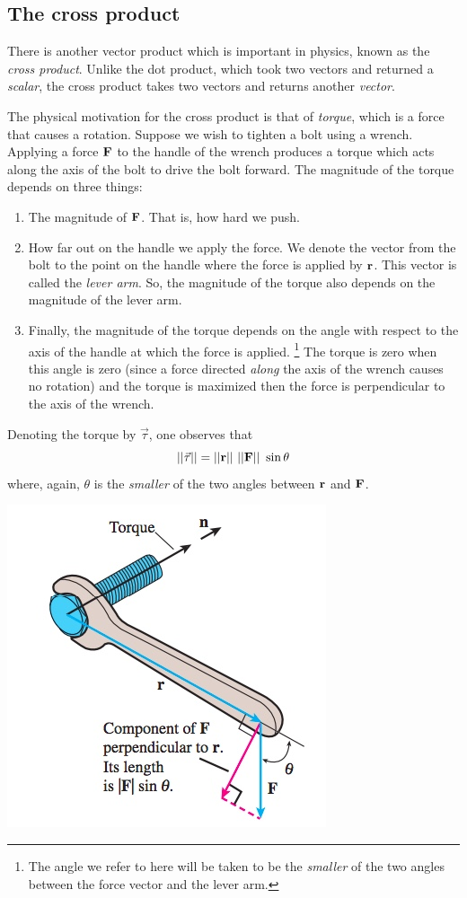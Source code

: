 \documentclass[12pt,letterpaper,reqno]{article}
\numberwithin{equation}{section}
\newcommand{\ti}[1]{\textit{#1}}
\begin{document}
\subsection{The cross product}
There is another vector product which is important in physics, known as the \ti{cross product}. Unlike the dot product, which took two vectors and returned a \ti{scalar}, the cross product takes two vectors and returns another \ti{vector}.

The physical motivation for the cross product is that of \ti{torque}, which is a force that causes a rotation. Suppose we wish to tighten a bolt using a wrench. Applying a force ${\bf F}$ to the handle of the wrench produces a torque which acts along the axis of the bolt to drive the bolt forward. The magnitude of the torque depends on three things:
\begin{enumerate}
	\item The magnitude of ${\bf F}$. That is, how hard we push.
	\item How far out on the handle we apply the force. We denote the vector from the bolt to the point on the handle where the force is applied by ${\bf r}$. This vector is called the \ti{lever arm}. So, the magnitude of the torque also depends on the magnitude of the lever arm.
	\item Finally, the magnitude of the torque depends on the angle with respect to the axis of the handle at which the force is applied. \footnote{The angle we refer to here will be taken to be the \ti{smaller} of the two angles between the force vector and the lever arm.} The torque is zero when this angle is zero (since a force directed \ti{along} the axis of the wrench causes no rotation) and the torque is maximized then the force is perpendicular to the axis of the wrench.
\end{enumerate}
Denoting the torque by $\vec{\tau}$, one observes that 
\begin{equation}\label{eq:magnitude_of_torque}
	||\vec{\tau}||=||{\bf r}||\ ||{\bf F}||\ \sin \theta
\end{equation}
where, again, $\theta$ is the \ti{smaller} of the two angles between ${\bf r}$ and ${\bf F}$.
\begin{center}
	\includegraphics[scale=0.5]{figures_mvc/torque_wrench}
\end{center}
\end{document}
